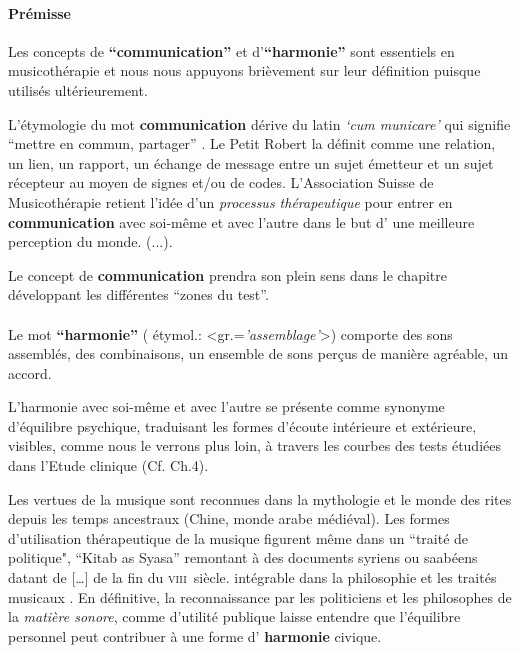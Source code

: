 \paragraph{Prémisse}





Les concepts de \textbf{``communication''} et  d'\textbf{``harmonie''}
sont essentiels en
musicothérapie et nous nous appuyons brièvement
sur leur définition puisque utilisés ultérieurement.


L'étymologie du mot  \textbf{communication} dérive du latin  \textit{`cum
  municare'} qui signifie ``mettre en commun, partager'' \autocite{dicpetitrobert}.
Le Petit Robert la définit comme une
relation, un lien, un rapport, un échange de message entre un sujet émetteur et un
sujet récepteur au moyen de signes et/ou de codes.
L'Association Suisse
de Musicothérapie retient l'idée d'un\textit{ processus thérapeutique }pour entrer en \textbf{communication} avec soi-même et avec
l'autre dans le but d' une meilleure perception du
monde. (...)\autocite{site_musitherapy}.


Le concept de \textbf{communication} prendra son plein sens
dans le chapitre développant les différentes ``zones du test''.
\paragraph{}
Le mot \textbf{``harmonie''} ( étymol.:
<gr.=\textit{'assemblage'}>) comporte
 des sons assemblés, des combinaisons, un ensemble de sons perçus de
 manière agréable, un accord.

 L'harmonie avec soi-même et avec l'autre se présente comme  synonyme d'équilibre
psychique, traduisant les formes d'écoute intérieure et
extérieure,  visibles, comme nous le verrons plus loin, à travers les courbes des tests étudiées
dans l'Etude clinique (Cf. Ch.4).

Les vertues de la musique sont reconnues dans la mythologie et le
monde des rites depuis les temps ancestraux (Chine, monde arabe
médiéval).
Les formes d'utilisation
thérapeutique de la musique figurent même dans un ``traité de politique",
``Kitab as Syasa'' remontant à des documents syriens ou saabéens datant de  [\dots] de la fin du
\textsc{viii}\ieme\ siècle.   intégrable dans la
philosophie et les traités musicaux \autocite[ch. III, p.
96]{vrait_musicotherapie_2018}.
En définitive, la reconnaissance par les  politiciens  et les
philosophes de la \textit{matière sonore}, comme d'utilité
publique laisse entendre que l'équilibre personnel
peut contribuer à une forme d' \textbf{harmonie }civique.


